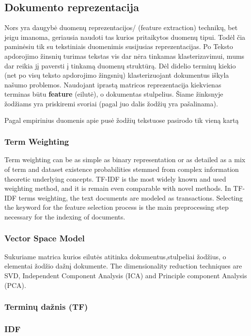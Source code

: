 \documentclass{VUMIFInfKursinis}
\begin{document}
	\subsection{Dokumento reprezentacija}
		Nors yra daugybė duomenų reprezentacijos/ (feature extraction) technikų, bet jeigu imanoma, geriausia naudoti tas kurios pritaikytos duomenų tipui\cite{alelyani2013feature}. Todėl čia paminėsiu tik su tekstiniais duomenimis susijusias reprezentacijas.
		Po Teksto apdorojimo žinsnių turimas tekstas vis dar nėra tinkamas klasterizavimui, mums dar reikia jį paversti į tinkamą duomenų struktūrą. Dėl didelio terminų kiekio (net po visų teksto apdorojimo žingsnių) klasterizuojant dokumentus iškyla našumo problemos. Naudojant iprastą matricos reprezentacija kiekvienas terminas būtu \textbf{feature} (eilutė), o dokumentas stulpelius. Šiame žinksnyje žodžiams yra priskiremi svoriai (pagal juo dalis žodžių yra pašalinama).

		Pagal empirinius duomenis apie pusė žodžių tekstuose pasirodo tik vieną kartą \cite{piaseckiene2014statistiniai} 
		\subsubsection{Term Weighting}
			Term weighting can be as simple as binary representation or as detailed as a mix of term and dataset existence probabilities stemmed from complex information theoretic underlying concepts. TF-IDF is the most widely known and used weighting method, and it is remain even comparable with novel methods. In TF-IDF terms weighting, the text documents are modeled as transactions.  Selecting the keyword for the feature selection process is the main preprocessing step necessary for the indexing of documents.
		\subsubsection{Vector Space Model}
			Sukuriame matrica kurios eilutės atitinka dokumentus,stulpeliai žodžius, o elementai žodžio dažnį dokumente.
			The dimensionality reduction techniques are SVD, Independent Component Analysis (ICA) and Principle component Analysis (PCA). 

		\subsubsection{Terminų dažnis (TF)}

		\subsubsection{IDF}
\end{document}
